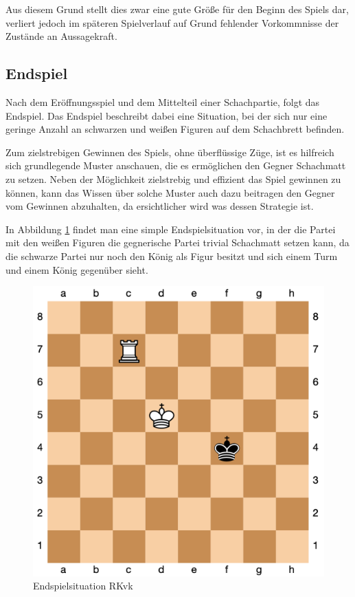 Aus diesem Grund stellt dies zwar eine gute Größe für den Beginn des Spiels dar, verliert jedoch im späteren Spielverlauf auf Grund fehlender Vorkommnisse der Zustände an Aussagekraft.


\subsection{Endspiel}\label{finishing_evaluation}
Nach dem Eröffnungsspiel und dem Mittelteil einer Schachpartie, folgt das Endspiel. Das Endspiel beschreibt dabei eine Situation, bei der sich nur eine geringe Anzahl an schwarzen und weißen Figuren auf dem Schachbrett befinden. 

Zum zielstrebigen Gewinnen des Spiels, ohne überflüssige Züge, ist es hilfreich sich grundlegende Muster anschauen, die es ermöglichen den Gegner Schachmatt zu setzen. Neben der Möglichkeit zielstrebig und effizient das Spiel gewinnen zu können, kann das Wissen über solche Muster auch dazu beitragen den Gegner vom Gewinnen abzuhalten, da ersichtlicher wird was dessen Strategie ist.

In Abbildung \ref{fig:RKvk} findet man eine simple Endspielsituation vor, in der die Partei mit den weißen Figuren die gegnerische Partei trivial Schachmatt setzen kann, da die schwarze Partei nur noch den König als Figur besitzt und sich einem Turm und einem König gegenüber sieht.

\begin{figure}[h]
\centering
\includegraphics[width=\textwidth/5*4]{images/RKvk.png}

\caption{Endspielsituation RKvk}\label{fig:RKvk}
\end{figure}

